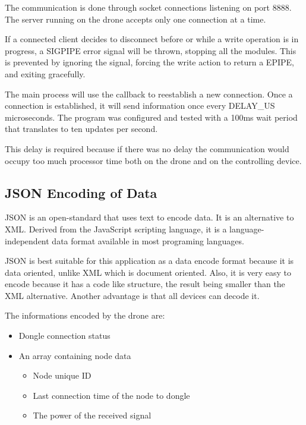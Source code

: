 The communication is done through socket connections listening on port 8888. The server running on the drone accepts only one connection at a time.

If a connected client decides to disconnect before or while a write operation is in progress, a SIGPIPE error signal will be thrown, stopping all the modules. This is prevented by ignoring the signal, forcing the write action to return a EPIPE, and exiting gracefully.

The main process will use the callback  to reestablish a new connection. Once a connection is established, it will send information once every DELAY\_US microseconds. The program was configured and tested with a 100ms wait period that translates to ten updates per second.

This delay is required because if there was no delay the communication would occupy too much processor time both on the drone and on the controlling device.

\subsection{JSON Encoding of Data}

JSON \cite{json} is an open-standard that uses text to encode data. It is an alternative to XML. Derived from the JavaScript scripting language, it is a language-independent data format available in most programing languages.

JSON is best suitable for this application as a data encode format because it is data oriented, unlike XML which is document oriented. Also, it is very easy to encode because it has a code like structure, the result being smaller than the XML alternative. Another advantage is that all devices can decode it. 

The informations encoded by the drone are:
\begin{itemize}

\item Dongle connection status
\item An array containing node data
\begin{itemize}

	\item Node unique ID
	\item Last connection time of the node to dongle
	\item The power of the received signal

	\end{itemize}
\end{itemize}
 

